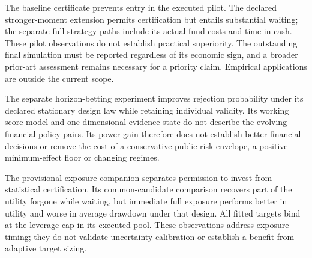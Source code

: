 \documentclass[11pt,a4paper]{article}
\theoremstyle{remark}\newtheorem{remark}[theorem]{Remark}
\begin{document}
The baseline certificate prevents entry in the executed pilot. The declared
stronger-moment extension permits certification but entails substantial waiting;
the separate full-strategy paths include its actual fund costs and time in cash.
These pilot observations do not establish practical superiority. The outstanding
final simulation must be reported regardless of its economic sign, and a broader
prior-art assessment remains necessary for a priority claim. Empirical
applications are outside the current scope.

The separate horizon-betting experiment improves rejection probability under
its declared stationary design law while retaining individual validity.
Its working score model and one-dimensional evidence state do not describe
the evolving financial policy pairs. Its power gain therefore does not
establish better financial decisions or remove the cost of a conservative
public risk envelope, a positive minimum-effect floor or changing regimes.

The provisional-exposure companion separates permission to invest from
statistical certification. Its common-candidate comparison recovers part of
the utility forgone while waiting, but immediate full exposure performs
better in utility and worse in average drawdown under that design.
All fitted targets bind at the leverage cap in its executed pool. These
observations address exposure timing; they do not validate uncertainty
calibration or establish a benefit from adaptive target sizing.

\appendix
\begingroup\small
\end{document}

